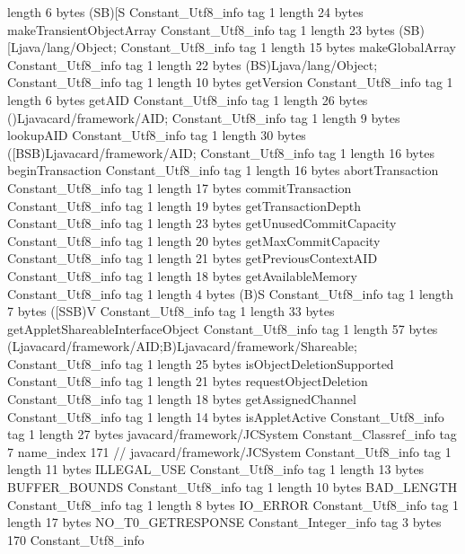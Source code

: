 {{{			length	6
			bytes	(SB)[S
		}
		Constant_Utf8_info {
			tag	1
			length	24
			bytes	makeTransientObjectArray
		}
		Constant_Utf8_info {
			tag	1
			length	23
			bytes	(SB)[Ljava/lang/Object;
		}
		Constant_Utf8_info {
			tag	1
			length	15
			bytes	makeGlobalArray
		}
		Constant_Utf8_info {
			tag	1
			length	22
			bytes	(BS)Ljava/lang/Object;
		}
		Constant_Utf8_info {
			tag	1
			length	10
			bytes	getVersion
		}
		Constant_Utf8_info {
			tag	1
			length	6
			bytes	getAID
		}
		Constant_Utf8_info {
			tag	1
			length	26
			bytes	()Ljavacard/framework/AID;
		}
		Constant_Utf8_info {
			tag	1
			length	9
			bytes	lookupAID
		}
		Constant_Utf8_info {
			tag	1
			length	30
			bytes	([BSB)Ljavacard/framework/AID;
		}
		Constant_Utf8_info {
			tag	1
			length	16
			bytes	beginTransaction
		}
		Constant_Utf8_info {
			tag	1
			length	16
			bytes	abortTransaction
		}
		Constant_Utf8_info {
			tag	1
			length	17
			bytes	commitTransaction
		}
		Constant_Utf8_info {
			tag	1
			length	19
			bytes	getTransactionDepth
		}
		Constant_Utf8_info {
			tag	1
			length	23
			bytes	getUnusedCommitCapacity
		}
		Constant_Utf8_info {
			tag	1
			length	20
			bytes	getMaxCommitCapacity
		}
		Constant_Utf8_info {
			tag	1
			length	21
			bytes	getPreviousContextAID
		}
		Constant_Utf8_info {
			tag	1
			length	18
			bytes	getAvailableMemory
		}
		Constant_Utf8_info {
			tag	1
			length	4
			bytes	(B)S
		}
		Constant_Utf8_info {
			tag	1
			length	7
			bytes	([SSB)V
		}
		Constant_Utf8_info {
			tag	1
			length	33
			bytes	getAppletShareableInterfaceObject
		}
		Constant_Utf8_info {
			tag	1
			length	57
			bytes	(Ljavacard/framework/AID;B)Ljavacard/framework/Shareable;
		}
		Constant_Utf8_info {
			tag	1
			length	25
			bytes	isObjectDeletionSupported
		}
		Constant_Utf8_info {
			tag	1
			length	21
			bytes	requestObjectDeletion
		}
		Constant_Utf8_info {
			tag	1
			length	18
			bytes	getAssignedChannel
		}
		Constant_Utf8_info {
			tag	1
			length	14
			bytes	isAppletActive
		}
		Constant_Utf8_info {
			tag	1
			length	27
			bytes	javacard/framework/JCSystem
		}
		Constant_Classref_info {
			tag	7
			name_index	171		// javacard/framework/JCSystem
		}
		Constant_Utf8_info {
			tag	1
			length	11
			bytes	ILLEGAL_USE
		}
		Constant_Utf8_info {
			tag	1
			length	13
			bytes	BUFFER_BOUNDS
		}
		Constant_Utf8_info {
			tag	1
			length	10
			bytes	BAD_LENGTH
		}
		Constant_Utf8_info {
			tag	1
			length	8
			bytes	IO_ERROR
		}
		Constant_Utf8_info {
			tag	1
			length	17
			bytes	NO_T0_GETRESPONSE
		}
		Constant_Integer_info {
			tag	3
			bytes	170
		}
		Constant_Utf8_info {
}}}
